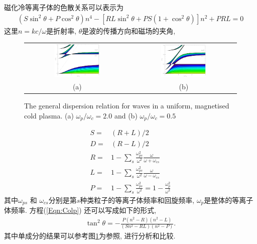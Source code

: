 \documentclass{article}
\begin{document}
	磁化冷等离子体的色散关系可以表示为\citep{Diver2001}
	\begin{align}
		\left(S \sin^2 \theta + P \cos^2 \theta\right) n^4 - \left[R L \sin^2 \theta
		+ P S \left(1 + \cos^2 \theta\right) \right] n^2 + P R L= 0 \label{Eqn:Colp}
	\end{align}
	这里$n = k c / \omega$是折射率, $\theta$是波的传播方向和磁场的夹角,
	\begin{figure}[htb]
		\begin{tabular}{cc}
			\includegraphics[width=0.45\textwidth]{figure2_2.eps} &
			\includegraphics[width=0.45\textwidth]{figure2_1.eps}
			\\
			(a) & (b)
		\end{tabular}
		\caption{The general dispersion relation for waves in a uniform, magnetised cold
			plasma. (a) $\omega_p / \omega_c = 2.0$ and (b) $\omega_p / \omega_c = 0.5$} \label{ColdPlasma}
	\end{figure}
	\begin{align*}
		S =& (R + L) / 2
		\\
		D =& (R - L) / 2
		\\
		R =& 1 - \sum_s \frac{\omega_{ps}^2}{\omega^2} \frac{\omega}{\omega + \omega_{cs}}
		\\
		L =& 1 - \sum_s \frac{\omega_{ps}^2}{\omega^2} \frac{\omega}{\omega - \omega_{cs}}
		\\
		P =& 1 - \sum_s \frac{\omega_{ps}^2}{\omega^2}  = 1 - \frac{\omega_p^2}{\omega^2}
	\end{align*}
	其中$\omega_{ps}$ 和 $\omega_{cs}$分别是第$s$种类粒子的等离子体频率和回旋频率, $\omega_p$是整体的等离子体频率. 方程(\ref{Eqn:Colp}) 还可以写成如下的形式,
	\begin{align*}
		\tan^2 \theta = - \frac{P (n^2 - R) (n^2 - L)}{(S n^2 - R L) (n^2 - P)}.
	\end{align*}
	其中单成分的结果可以参考图\ref{ColdPlasma}为参照, 进行分析和比较.
	
\end{document}
